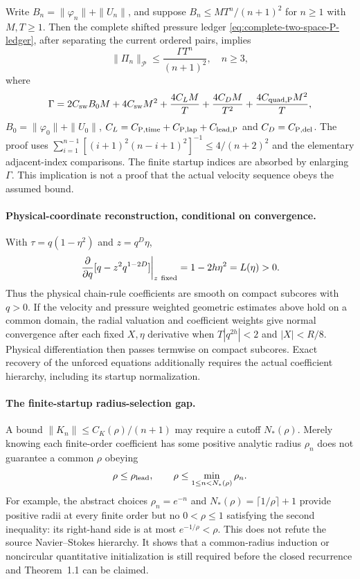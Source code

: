 Write $B_n=\|\varphi_n\|+\|U_n\|$, and suppose
$B_n\le MT^n/(n+1)^2$ for $n\ge1$ with $M,T\ge1$.
Then the complete shifted pressure ledger
\eqref{eq:complete-two-space-P-ledger},
after separating the current ordered pairs, implies
\begin{equation}\label{eq:conditional-pressure-geometric}
\|\Pi_n\|_{\mathcal P}
\le\frac{\Gamma T^n}{(n+1)^2},\quad n\ge3,
\end{equation}
where
\[
\Gamma=2C_{\rm sw}B_0M+4C_{\rm sw}M^2
+\frac{4C_LM}{T}+\frac{4C_DM}{T^2}
+\frac{4C_{\rm quad,P}M^2}{T},
\]
$B_0=\|\varphi_0\|+\|U_0\|$,
$C_L=C_{\rm P,time}+C_{\rm P,lap}+C_{\rm lead,P}$
and $C_D=C_{\rm P,del}$. The proof uses
$\sum_{i=1}^{n-1}[(i+1)^2(n-i+1)^2]^{-1}
\le4/(n+2)^2$ and the elementary adjacent-index
comparisons. The finite startup indices are absorbed by
enlarging $\Gamma$. This implication is not a proof that
the actual velocity sequence obeys the assumed bound.

\paragraph{Physical-coordinate reconstruction, conditional on convergence.}
With $\tau=q(1-\eta^2)$ and $z=q^D\eta$,
\begin{equation}\label{eq:coordinate-inverse-Jacobian}
\left.\frac\partial{\partial q}
[q-z^2q^{1-2D}]\right|_{z\ {\rm fixed}}
=1-2h\eta^2=L(\eta)>0.
\end{equation}
Thus the physical chain-rule coefficients are smooth on
compact subcores with $q>0$. If the velocity and pressure
weighted geometric estimates above hold on a common domain,
the radial valuation and coefficient weights give normal
convergence after each fixed $X,\eta$ derivative when
$T|q^{2h}|<2$ and $|X|<R/8$. Physical differentiation
then passes termwise on compact subcores. Exact recovery
of the unforced equations additionally requires the actual
coefficient hierarchy, including its startup normalization.

\paragraph{The finite-startup radius-selection gap.}
A bound $\|K_n\|\le C_K(\rho)/(n+1)$ may require a cutoff
$N_*(\rho)$. Merely knowing each finite-order coefficient
has some positive analytic radius $\rho_n$ does not
guarantee a common $\rho$ obeying
\begin{equation}\label{eq:radius-startup-fixed-point}
\rho\le\rho_{\rm lead},\qquad
\rho\le\min_{1\le n<N_*(\rho)}\rho_n.
\end{equation}
For example, the abstract choices $\rho_n=e^{-n}$ and
$N_*(\rho)=\lceil1/\rho\rceil+1$ provide positive radii
at every finite order but no $0<\rho\le1$ satisfying
the second inequality: its right-hand side is at most
$e^{-1/\rho}<\rho$. This does not refute the source
Navier--Stokes hierarchy. It shows that a common-radius
induction or noncircular quantitative initialization is
still required before the closed recurrence and
Theorem~1.1 can be claimed.
